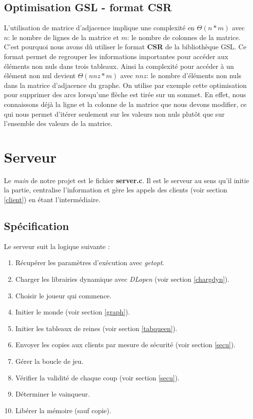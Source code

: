\documentclass{article}
\begin{document}
\subsection{Optimisation GSL - format CSR}
L'utilisation de matrice d'adjacence implique une complexité en $\Theta(n*m) $ avec $n$: le nombre de lignes de la matrice et $m$: le nombre de colonnes de la matrice. C'est pourquoi nous avons dû utiliser le format \textbf{CSR} de la bibliothèque GSL. Ce format permet de regrouper les informations importantes pour accéder aux éléments non nuls dans trois tableaux. Ainsi la complexité pour accéder à un élément non nul devient $\Theta(nnz*m)$ avec $nnz$: le nombre d'éléments non nuls dans la matrice d'adjacence du graphe. On utilise par exemple cette optimisation pour supprimer des arcs lorsqu'une flèche est tirée sur un sommet. En effet, nous connaissons déjà la ligne et la colonne de la matrice que nous devons modifier, ce qui nous permet d'itérer seulement sur les valeurs non nuls plutôt que sur l'ensemble des valeurs de la matrice. 
\newpage
\section{Serveur}
Le \textit{main} de notre projet est le fichier \textbf{server.c}. Il est le serveur au sens qu'il initie la partie, centralise l'information et gère les appels des clients (voir section \ref{client}) en étant l'intermédiaire.

\subsection{Spécification}
Le serveur suit la logique suivante :

\begin{enumerate}
    \item Récupérer les paramètres d'exécution avec \textit{getopt}.
    \item Charger les librairies dynamique avec \textit{DLopen} (voir section \ref{chargdyn}).
    \item Choisir le joueur qui commence.
    \item Initier le monde (voir section \ref{graph}).
    \item Initier les tableaux de reines (voir section \ref{tabqueen}).
    \item Envoyer les copies aux clients par mesure de sécurité (voir section \ref{secu}).
    \item Gérer la boucle de jeu.
    \item Vérifier la validité de chaque coup (voir section \ref{secu}).
    \item Déterminer le vainqueur.
    \item Libérer la mémoire (sauf copie).
    
\end{enumerate}
\end{document}
